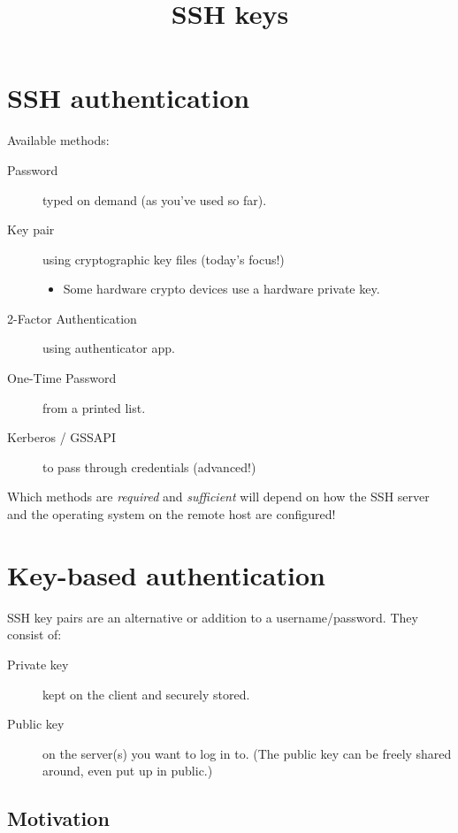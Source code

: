 \documentclass[slides]{pgnotes}
\title{SSH keys}
\begin{document}
\maketitle

\section{SSH authentication}

Available methods:
\begin{description}
\item[Password] typed on demand (as you've used so far).
\item[Key pair] using cryptographic key files (today's focus!)
  \begin{itemize}
  \item Some hardware crypto devices use a hardware private key.
  \end{itemize}
\item[2-Factor Authentication] using authenticator app.
\item[One-Time Password] from a printed list.
\item[Kerberos / GSSAPI] to pass through credentials (advanced!)
\end{description}

Which methods are \textit{required} and \textit{sufficient} will depend on how the SSH server and the operating system on the remote host are configured!

\section{Key-based authentication}
\label{key-based-authentication}

SSH key pairs are an alternative or addition to a username/password.
They consist of:

\begin{description}
\item[Private key]
kept on the client and securely stored.
\item[Public key]
on the server(s) you want to log in to. (The public key can be freely
shared around, even put up in public.)
\end{description}


\subsection{Motivation}
\end{document}
